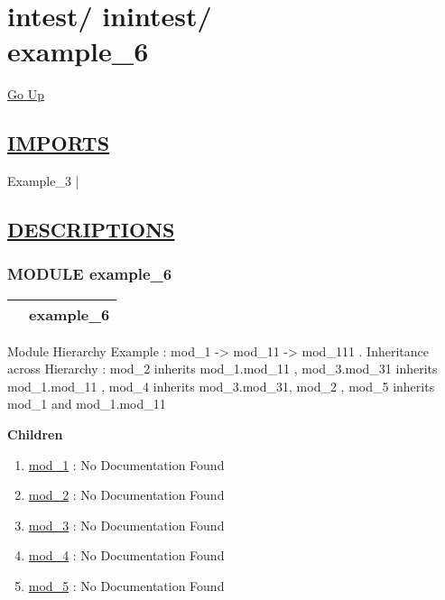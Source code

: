 \chapter*{\color{headfile}
{\large intest\slash\hspace{0pt}}
{\large inintest\slash\hspace{0pt}}
 \\
example_6
}
\hypertarget{ecldoc:toc:intest.inintest.example_6}{}
\hyperlink{ecldoc:toc:root/intest/inintest}{Go Up}

\section*{\underline{\textsf{IMPORTS}}}
\begin{doublespace}
{\large
Example\_3 |
}
\end{doublespace}

\section*{\underline{\textsf{DESCRIPTIONS}}}
\subsection*{\textsf{\colorbox{headtoc}{\color{white} MODULE}
example\_6}}

\hypertarget{ecldoc:intest.inintest.example_6}{}

{\renewcommand{\arraystretch}{1.5}
\begin{tabularx}{\textwidth}{|>{\raggedright\arraybackslash}l|X|}
\hline
\hspace{0pt}\mytexttt{\color{red} } & \textbf{example\_6} \\
\hline
\end{tabularx}
}

\par





Module Hierarchy Example : mod\_1 -> mod\_11 -> mod\_111 . Inheritance across Hierarchy : mod\_2 inherits mod\_1.mod\_11 , mod\_3.mod\_31 inherits mod\_1.mod\_11 , mod\_4 inherits mod\_3.mod\_31, mod\_2 , mod\_5 inherits mod\_1 and mod\_1.mod\_11







\textbf{Children}
\begin{enumerate}
\item \hyperlink{ecldoc:intest.inintest.example_6.mod_1}{mod\_1}
: No Documentation Found
\item \hyperlink{ecldoc:intest.inintest.example_6.mod_2}{mod\_2}
: No Documentation Found
\item \hyperlink{ecldoc:intest.inintest.example_6.mod_3}{mod\_3}
: No Documentation Found
\item \hyperlink{ecldoc:intest.inintest.example_6.mod_4}{mod\_4}
: No Documentation Found
\item \hyperlink{ecldoc:intest.inintest.example_6.mod_5}{mod\_5}
: No Documentation Found
\end{enumerate}

